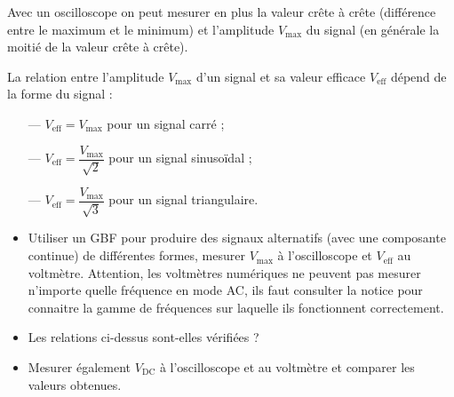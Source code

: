 \documentclass{tp}
\begin{document}
\begin{center}
%
\end{center}


Avec un oscilloscope on peut mesurer en plus la valeur crête à crête (différence entre le maximum et le minimum) et l'amplitude $V_\text{max}$ du signal (en générale la moitié de la valeur crête à crête).

La relation entre l'amplitude $V_\text{max}$ d'un signal et sa valeur efficace $V_\text{eff}$ dépend de la forme du signal :
\begin{itemize}
	\item[---] $V_\text{eff}=V_\text{max}$ pour un signal carré ;

	\item[---] $V_\text{eff}=\dfrac{V_\text{max}}{\sqrt{2}}$ pour un signal sinusoïdal ;

	\item[---] $V_\text{eff}=\dfrac{V_\text{max}}{\sqrt{3}}$ pour un signal triangulaire.
\end{itemize}

\begin{itemize}
	\item Utiliser un GBF pour produire des signaux alternatifs (avec une composante continue) de différentes formes, mesurer $V_\text{max}$ à l'oscilloscope et $V_\text{eff}$ au voltmètre. Attention, les voltmètres numériques ne peuvent pas mesurer n'importe quelle fréquence en mode AC, ils faut consulter la notice pour connaitre la gamme de fréquences sur laquelle ils fonctionnent correctement.

	\item Les relations ci-dessus sont-elles vérifiées ?

	\item Mesurer également $V_\text{DC}$ à l'oscilloscope et au voltmètre et comparer les valeurs obtenues.
\end{itemize}
\end{document}
